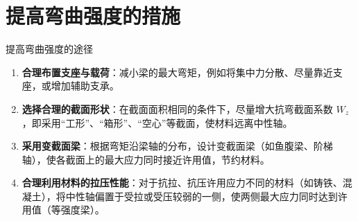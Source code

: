 \section{提高弯曲强度的措施}

\begin{myhypothesis}{提高弯曲强度的途径}
    \begin{enumerate}
        \item \textbf{合理布置支座与载荷}：减小梁的最大弯矩，例如将集中力分散、尽量靠近支座，或增加辅助支承。
        \item \textbf{选择合理的截面形状}：在截面面积相同的条件下，尽量增大抗弯截面系数 \(W_z\)，即采用“工形”、“箱形”、“空心”等截面，使材料远离中性轴。
        \item \textbf{采用变截面梁}：根据弯矩沿梁轴的分布，设计变截面梁（如鱼腹梁、阶梯轴），使各截面上的最大应力同时接近许用值，节约材料。
        \item \textbf{合理利用材料的拉压性能}：对于抗拉、抗压许用应力不同的材料（如铸铁、混凝土），将中性轴偏置于受拉或受压较弱的一侧，使两侧最大应力同时达到许用值（等强度梁）。
    \end{enumerate}
\end{myhypothesis}

